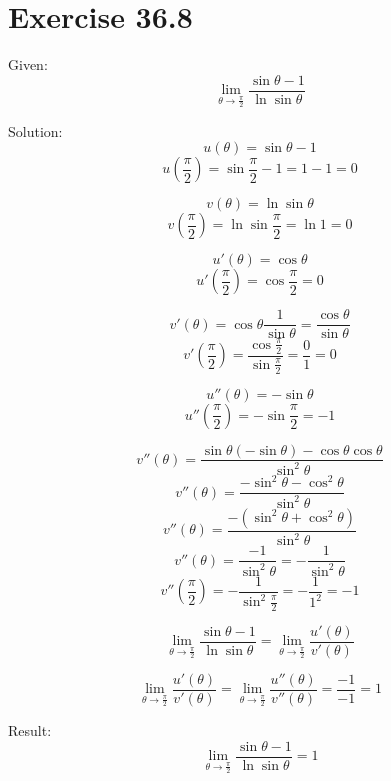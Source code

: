 \documentclass[a4paper, 10pt]{scrartcl}
\begin{document}
\section{Exercise 36.8}

Given:
\[\lim_{\theta\to \frac{\pi}{2}}{\frac{\sin{\theta} - 1}{\ln{\sin{\theta}}}}\]

Solution:
\[u(\theta) = \sin{\theta} - 1\]
\[u(\frac{\pi}{2}) = \sin{\frac{\pi}{2}} - 1 = 1 - 1 = 0\]

\[v(\theta) = \ln{\sin{\theta}}\]
\[v(\frac{\pi}{2}) = \ln{\sin{\frac{\pi}{2}}} = \ln{1} = 0\]

\[u'(\theta) = \cos{\theta}\]
\[u'(\frac{\pi}{2}) = \cos{\frac{\pi}{2}} = 0\]

\[v'(\theta) = \cos{\theta}\frac{1}{\sin{\theta}} = \frac{\cos{\theta}}{\sin{\theta}}\]
\[v'(\frac{\pi}{2}) = \frac{\cos{\frac{\pi}{2}}}{\sin{\frac{\pi}{2}}} = \frac{0}{1} = 0\]

\[u''(\theta) = -\sin{\theta}\]
\[u''(\frac{\pi}{2}) = -\sin{\frac{\pi}{2}} = -1\]

\[v''(\theta) = \frac{\sin{\theta}(-\sin{\theta}) - \cos{\theta}\cos{\theta}}{\sin^{2}{\theta}}\]
\[v''(\theta) = \frac{-\sin^{2}{\theta} - \cos^{2}{\theta}}{\sin^{2}{\theta}}\]
\[v''(\theta) = \frac{-(\sin^{2}{\theta} + \cos^{2}{\theta})}{\sin^{2}{\theta}}\]
\[v''(\theta) = \frac{-1}{\sin^{2}{\theta}} = -\frac{1}{\sin^{2}{\theta}}\]
\[v''(\frac{\pi}{2}) = -\frac{1}{\sin^{2}{\frac{\pi}{2}}} = -\frac{1}{1^{2}} = -1\]

\[\lim_{\theta\to \frac{\pi}{2}}{\frac{\sin{\theta} - 1}{\ln{\sin{\theta}}}} =
  \lim_{\theta\to \frac{\pi}{2}}{\frac{u'(\theta)}{v'(\theta)}}\]

\[\lim_{\theta\to \frac{\pi}{2}}{\frac{u'(\theta)}{v'(\theta)}} =
  \lim_{\theta\to \frac{\pi}{2}}{\frac{u''(\theta)}{v''(\theta)}} =
  \frac{-1}{-1} = 1\]

Result:
\[\lim_{\theta\to \frac{\pi}{2}}{\frac{\sin{\theta} - 1}{\ln{\sin{\theta}}}} = 1\]
\end{document}
